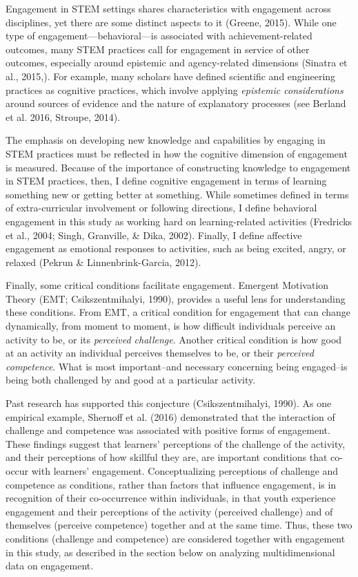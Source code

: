 \documentclass[]{msu-thesis}
\theoremstyle{definition}
\theoremstyle{definition}
\theoremstyle{definition}
\theoremstyle{remark}
\begin{document}
Engagement in STEM settings shares characteristics with engagement
across disciplines, yet there are some distinct aspects to it (Greene,
2015). While one type of engagement---behavioral---is associated with
achievement-related outcomes, many STEM practices call for engagement in
service of other outcomes, especially around epistemic and
agency-related dimensions (Sinatra et al., 2015,). For example, many
scholars have defined scientific and engineering practices as cognitive
practices, which involve applying \emph{epistemic considerations} around
sources of evidence and the nature of explanatory processes (see Berland
et al. 2016, Stroupe, 2014).

The emphasis on developing new knowledge and capabilities by engaging in
STEM practices must be reflected in how the cognitive dimension of
engagement is measured. Because of the importance of constructing
knowledge to engagement in STEM practices, then, I define cognitive
engagement in terms of learning something new or getting better at
something. While sometimes defined in terms of extra-curricular
involvement or following directions, I define behavioral engagement in
this study as working hard on learning-related activities (Fredricks et
al., 2004; Singh, Granville, \& Dika, 2002). Finally, I define affective
engagement as emotional responses to activities, such as being excited,
angry, or relaxed (Pekrun \& Linnenbrink-Garcia, 2012).

Finally, some critical conditions facilitate engagement. Emergent
Motivation Theory (EMT; Csikszentmihalyi, 1990), provides a useful lens
for understanding these conditions. From EMT, a critical condition for
engagement that can change dynamically, from moment to moment, is how
difficult individuals perceive an activity to be, or its \emph{perceived
challenge}. Another critical condition is how good at an activity an
individual perceives themselves to be, or their \emph{perceived
competence}. What is most important--and necessary concerning being
engaged--is being both challenged by and good at a particular activity.

Past research has supported this conjecture (Csikszentmihalyi, 1990). As
one empirical example, Shernoff et al. (2016) demonstrated that the
interaction of challenge and competence was associated with positive
forms of engagement. These findings suggest that learners' perceptions
of the challenge of the activity, and their perceptions of how skillful
they are, are important conditions that co-occur with learners'
engagement. Conceptualizing perceptions of challenge and competence as
conditions, rather than factors that influence engagement, is in
recognition of their co-occurrence within individuals, in that youth
experience engagement and their perceptions of the activity (perceived
challenge) and of themselves (perceive competence) together and at the
same time. Thus, these two conditions (challenge and competence) are
considered together with engagement in this study, as described in the
section below on analyzing multidimensional data on engagement.
\end{document}
